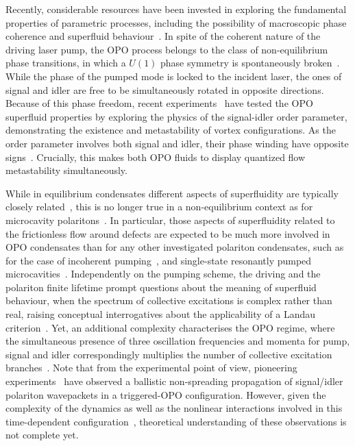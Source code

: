 Recently, considerable resources have been invested in exploring the
fundamental properties of parametric processes, including the
possibility of macroscopic phase coherence and superfluid
behaviour~\cite{Carusotto_2013}.
%
In spite of the coherent nature of the driving laser pump, the OPO
process belongs to the class of non-equilibrium phase transitions, in
which a $U(1)$ phase symmetry is spontaneously
broken~\cite{Wouters_2007}.
%
While the phase of the pumped mode is locked to the incident laser,
the ones of signal and idler are free to be simultaneously rotated in
opposite directions.
%
Because of this phase freedom, recent experiments~\cite{Sanvitto_2010}
have tested the OPO superfluid properties by exploring the physics of
the signal-idler order parameter, demonstrating the existence and
metastability of vortex configurations. As the order parameter
involves both signal and idler, their phase winding have opposite
signs~\cite{Sanvitto_2010,Marchetti_2010,9783642241857}.  Crucially, this
makes both OPO fluids to display quantized flow metastability
simultaneously.

While in equilibrium condensates different aspects of superfluidity
are typically closely related~\cite{Leggett_1999}, this is no longer
true in a non-equilibrium context as for microcavity
polaritons~\cite{Carusotto_2013}.
%
In particular, those aspects of superfluidity related to the
frictionless flow around defects are expected to be much more involved
in OPO condensates than for any other investigated polariton
condensates, such as for the case of incoherent
pumping~\cite{Kasprzak_2006,Wouters_2010}, and single-state
resonantly pumped microcavities~\cite{Amo_2009}.
%
Independently on the pumping scheme, the driving and the polariton
finite lifetime prompt questions about the meaning of superfluid
behaviour, when the spectrum of collective excitations is complex
rather than real, raising conceptual interrogatives about the
applicability of a Landau criterion~\cite{Wouters_2010}.
%
Yet, an additional complexity characterises the OPO regime, where the
simultaneous presence of three oscillation frequencies and momenta for
pump, signal and idler correspondingly multiplies the number of
collective excitation branches~\cite{Wouters_2007}.
%
Note that from the experimental point of view, pioneering
experiments~\cite{Amo_2009_b} have observed a ballistic non-spreading
propagation of signal/idler polariton wavepackets in a triggered-OPO
configuration.
%
However, given the complexity of the dynamics as well as the nonlinear
interactions involved in this time-dependent
configuration~\cite{Szyma_ska_2010}, theoretical understanding of these
observations is not complete yet.

